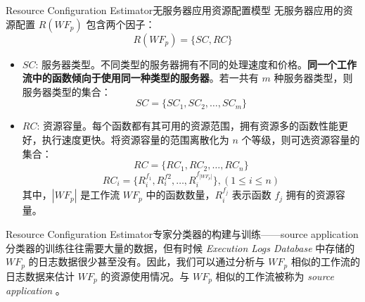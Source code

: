 \documentclass[aspectratio=169]{beamer}
\begin{document}
\begin{frame}{Resource Configuration Estimator}{无服务器应用资源配置模型}
  无服务器应用的资源配置 $R(WF_p)$ 包含两个因子：
  \begin{equation*}
    R(WF_p) = \{SC, RC\}
  \end{equation*}
  \begin{itemize}
    \item $SC$: 服务器类型。不同类型的服务器拥有不同的处理速度和价格。\textbf{同一个工作流中的函数倾向于使用同一种类型的服务器}。若一共有 $m$ 种服务器类型，则服务器类型的集合： \[SC = \{SC_1,SC_2, \dots ,SC_m\}\]
    \item $RC$: 资源容量。每个函数都有其可用的资源范围，拥有资源多的函数性能更好，执行速度更快。将资源容量的范围离散化为 $n$ 个等级，则可选资源容量的集合： \[RC = \{RC_1,RC_2, \dots ,RC_n\}\] \[RC_i = \{R_i^{f_1}, R_i^{f2}, \dots ,R_i^{f_{|WF_p|}}\}, (1 \leqslant i \leqslant n)\] 其中，$|WF_p|$ 是工作流 $WF_p$ 中的函数数量，$R_i^{f_j}$ 表示函数 $f_j$ 拥有的资源容量。
  \end{itemize}
\end{frame}

\begin{frame}{Resource Configuration Estimator}{专家分类器的构建与训练——source application}
  分类器的训练往往需要大量的数据，但有时候 \textit{Execution Logs Database} 中存储的 $WF_p$ 的日志数据很少甚至没有。因此，我们可以通过分析与 $WF_p$ 相似的工作流的日志数据来估计 $WF_p$ 的资源使用情况。与 $WF_p$ 相似的工作流被称为 \textit{source application} 。
\end{frame}
\end{document}
